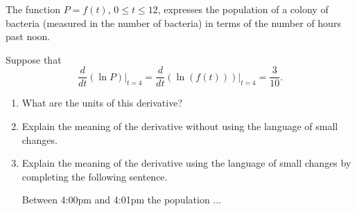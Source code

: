 \documentclass{ximera}
\begin{document}
\begin{question}  \label{Q5ghldfdfgng}
The function $P=f(t)$, $0\leq t \leq 12$, expresses the population of a colony of bacteria (measured in the number of bacteria) in terms of the number of hours past noon.

Suppose that
\[
   \frac{d}{dt} \left(  \ln P \right)\Big|_{t=4} = \frac{d}{dt} \left(  \ln (f(t)) \right)\Big|_{t=4}  = \frac{3}{10} .
\]

\begin{enumerate}
\item What are the units of this derivative?

\item Explain the meaning of the derivative without using the language of small changes.

\item Explain the meaning of the derivative using the language of small changes by completing the following sentence.

Between 4:00pm and 4:01pm the population ...
\end{enumerate}
\end{question}
\end{document}
